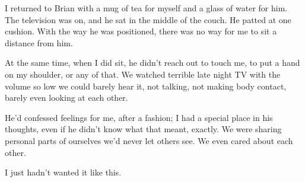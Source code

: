 I returned to Brian with a mug of tea for myself and a glass of water for him.  The television was on, and he sat in the middle of the couch.  He patted at one cushion.  With the way he was positioned, there was no way for me to sit a distance from him.



At the same time, when I did sit, he didn't reach out to touch me, to put a hand on my shoulder, or any of that.  We watched terrible late night TV with the volume so low we could barely hear it, not talking, not making body contact, barely even looking at each other.



He'd confessed feelings for me, after a fashion; I had a special place in his thoughts, even if he didn't know what that meant, exactly.  We were sharing personal parts of ourselves we'd never let others see.  We even cared about each other.



I just hadn't wanted it like this.






